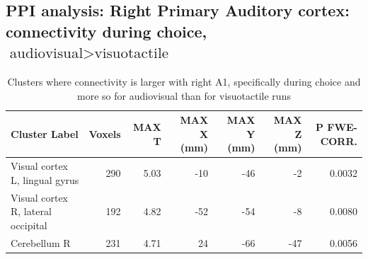 \subsection{PPI analysis: Right Primary Auditory cortex: connectivity during choice, $\text{audiovisual} > \text{visuotactile}$}

\begin{table}[htbp]
    \centering
    \begin{threeparttable}
    \caption{Clusters where connectivity is larger with right A1, specifically during choice and more so for audiovisual than for visuotactile runs}
    \label{tab:ppi_a1_r_choice}%
    \begin{tabularx}{\textwidth}{l *{6}{R}}
        \toprule
        \textbf{Cluster Label} & \textbf{Voxels} & \textbf{MAX T} & \textbf{MAX X (mm)} & \textbf{MAX Y (mm)} & \textbf{MAX Z (mm)} & \textbf{P FWE-CORR.} \\
        \midrule
        Visual cortex L, lingual gyrus & 290 & 5.03 & -10 & -46 & -2 & 0.0032 \\
        Visual cortex R, lateral occipital & 192 & 4.82 & -52 & -54 & -8 & 0.0080 \\
        Cerebellum R & 231 & 4.71 & 24 & -66 & -47 & 0.0056 \\
        \bottomrule
        \end{tabularx}
        \end{threeparttable}
\end{table}